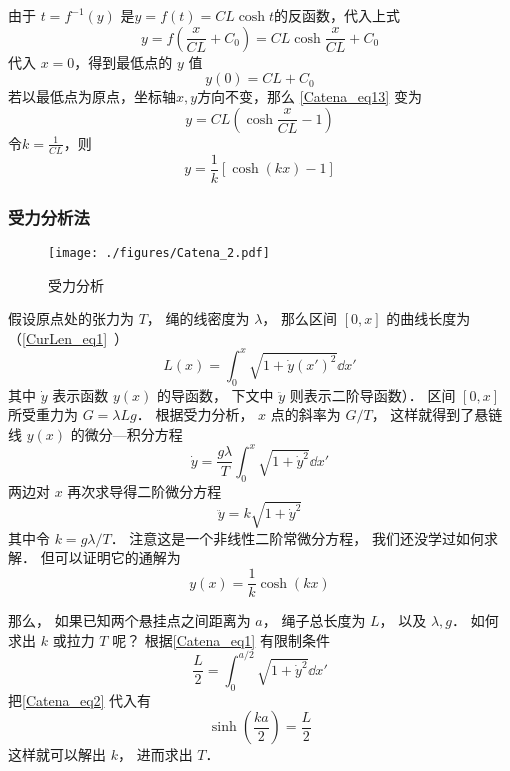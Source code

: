 由于 $t=f^{-1}(y)$ 是$y=f(t)=CL\cosh t$的反函数，代入上式
\begin{equation}\label{Catena_eq13}
y=f(\frac{x}{CL}+C_0)=CL\cosh \frac{x}{CL}+C_0
\end{equation}
代入 $x=0$，得到最低点的 $y$ 值
\begin{equation}
y(0)=CL+C_0
\end{equation}
若以最低点为原点，坐标轴$x,y$方向不变，那么 \autoref{Catena_eq13} 变为
\begin{equation}
y=CL(\cosh \frac{x}{CL}-1)
\end{equation}
令$k=\frac{1}{CL}$，则
\begin{equation}
y=\frac{1}{k}[\cosh (kx)-1]
\end{equation}
\subsubsection{受力分析法}
\begin{figure}[ht]
\centering
\texttt{[image: ./figures/Catena\_2.pdf]}
\caption{受力分析} \label{Catena_fig2}
\end{figure}
假设原点处的张力为 $T$， 绳的线密度为 $\lambda$， 那么区间 $[0, x]$ 的曲线长度为（\autoref{CurLen_eq1}~）
\begin{equation}\label{Catena_eq1}
L(x) = \int_0^x \sqrt{1 + \dot y(x')^2} \dd{x'}
\end{equation}
其中 $\dot y$ 表示函数 $y(x)$ 的导函数， 下文中 $\ddot y$ 则表示二阶导函数）． 区间 $[0, x]$ 所受重力为 $G = \lambda L g$． 根据受力分析， $x$ 点的斜率为 $G/T$， 这样就得到了悬链线 $y(x)$ 的微分—积分方程
\begin{equation}
\dot y = \frac{g\lambda}{T} \int_0^x \sqrt{1 + \dot y^2} \dd{x'}
\end{equation}
两边对 $x$ 再次求导得二阶微分方程
\begin{equation}
\ddot y = k \sqrt{1 + \dot y^2}
\end{equation}
其中令 $k = g\lambda/T$． 注意这是一个非线性二阶常微分方程， 我们还没学过如何求解． 但可以证明它的通解为
\begin{equation}\label{Catena_eq2}
y(x) = \frac{1}{k}\cosh(kx)
\end{equation}

那么， 如果已知两个悬挂点之间距离为 $a$， 绳子总长度为 $L$， 以及 $\lambda, g$． 如何求出 $k$ 或拉力 $T$ 呢？ 根据\autoref{Catena_eq1} 有限制条件
\begin{equation}
\frac{L}{2} = \int_0^{a/2} \sqrt{1 + \dot y^2} \dd{x'}
\end{equation}
把\autoref{Catena_eq2} 代入有
\begin{equation}
\sinh(\frac{ka}{2}) = \frac{L}{2}
\end{equation}
这样就可以解出 $k$， 进而求出 $T$．

